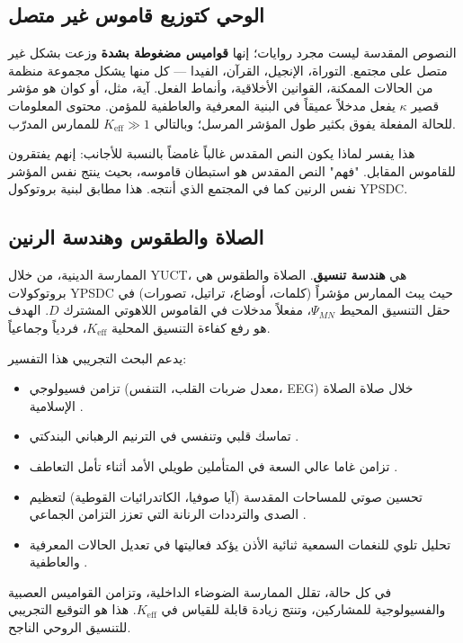 \documentclass[12pt,a4paper]{article}
\begin{document}
	\subsection{الوحي كتوزيع قاموس غير متصل}
	
	النصوص المقدسة ليست مجرد روايات؛ إنها \textbf{قواميس مضغوطة بشدة} وزعت بشكل غير متصل على مجتمع. التوراة، الإنجيل، القرآن، الفيدا — كل منها يشكل مجموعة منظمة من الحالات الممكنة، القوانين الأخلاقية، وأنماط الفعل. آية، مثل، أو كوان هو مؤشر قصير \(\kappa\) يفعل مدخلاً عميقاً في البنية المعرفية والعاطفية للمؤمن. محتوى المعلومات للحالة المفعلة يفوق بكثير طول المؤشر المرسل؛ وبالتالي \(K_{\mathrm{eff}} \gg 1\) للممارس المدرّب.
	
	هذا يفسر لماذا يكون النص المقدس غالباً غامضاً بالنسبة للأجانب: إنهم يفتقرون للقاموس المقابل. "فهم" النص المقدس هو استبطان قاموسه، بحيث ينتج نفس المؤشر نفس الرنين كما في المجتمع الذي أنتجه. هذا مطابق لبنية بروتوكول YPSDC.
	
	\subsection{الصلاة والطقوس وهندسة الرنين}
	
	الممارسة الدينية، من خلال YUCT، هي \textbf{هندسة تنسيق}. الصلاة والطقوس هي بروتوكولات YPSDC حيث يبث الممارس مؤشراً (كلمات، أوضاع، تراتيل، تصورات) في حقل التنسيق المحيط \(\Psi_{MN}\)، مفعلاً مدخلات في القاموس اللاهوتي المشترك \(D\). الهدف هو رفع كفاءة التنسيق المحلية \(K_{\mathrm{eff}}\)، فردياً وجماعياً.
	
	يدعم البحث التجريبي هذا التفسير:
	\begin{itemize}[leftmargin=*]
		\item تزامن فسيولوجي (معدل ضربات القلب، التنفس، EEG) خلال صلاة الصلاة الإسلامية \cite{RoyalSociety2024}.
		\item تماسك قلبي وتنفسي في الترنيم الرهباني البندكتي \cite{Craswell2023}.
		\item تزامن غاما عالي السعة في المتأملين طويلي الأمد أثناء تأمل التعاطف \cite{Lutz2017}.
		\item تحسين صوتي للمساحات المقدسة (آيا صوفيا، الكاتدرائيات القوطية) لتعظيم الصدى والترددات الرنانة التي تعزز التزامن الجماعي \cite{Pentcheva2020}.
		\item تحليل تلوي للنغمات السمعية ثنائية الأذن يؤكد فعاليتها في تعديل الحالات المعرفية والعاطفية \cite{Garcia2021}.
	\end{itemize}
	
	في كل حالة، تقلل الممارسة الضوضاء الداخلية، وتزامن القواميس العصبية والفسيولوجية للمشاركين، وتنتج زيادة قابلة للقياس في \(K_{\mathrm{eff}}\). هذا هو التوقيع التجريبي للتنسيق الروحي الناجح.
	
\end{document}
